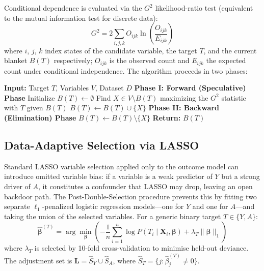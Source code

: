 \documentclass[11pt, a4paper]{article}
\theoremstyle{definition}
\begin{document}
Conditional dependence is evaluated via the $G^2$ likelihood-ratio test (equivalent to the
mutual information test for discrete data):
\begin{equation*}
    G^2 = 2 \sum_{i, j, k} O_{ijk} \ln \left( \frac{O_{ijk}}{E_{ijk}} \right)
\end{equation*}
where $i$, $j$, $k$ index states of the candidate variable, the target $T$, and the
current blanket $B(T)$ respectively; $O_{ijk}$ is the observed count and $E_{ijk}$ the
expected count under conditional independence. The algorithm proceeds in two phases:

\begin{algorithm}[H]
\caption{Fast-IAMB \cite{yaramakala2005speculative}}
\begin{algorithmic}[1]
\State \textbf{Input:} Target $T$, Variables $V$, Dataset $D$
\State \textbf{Phase I: Forward (Speculative) Phase}
\State Initialize $B(T) \gets \emptyset$
\Repeat
    \State Find $X \in V \setminus B(T)$ maximizing the $G^2$ statistic with $T$ given $B(T)$
        \State $B(T) \gets B(T) \cup \{X\}$
    \EndIf
{}
\State \textbf{Phase II: Backward (Elimination) Phase}
        \State $B(T) \gets B(T) \setminus \{X\}$
    \EndIf
\EndFor
\State \textbf{Return:} $B(T)$
\end{algorithmic}
\end{algorithm}

\subsection{Data-Adaptive Selection via LASSO}

Standard LASSO variable selection applied only to the outcome model can introduce omitted
variable bias: if a variable is a weak predictor of $Y$ but a strong driver of $A$, it
constitutes a confounder that LASSO may drop, leaving an open backdoor path. The
Post-Double-Selection procedure \cite{belloni2014inference} prevents this by fitting two
separate $\ell_1$-penalized logistic regression models---one for $Y$ and one for $A$---and
taking the union of the selected variables. For a generic binary target $T \in \{Y, A\}$:
\begin{equation*}
    \hat{\boldsymbol{\beta}}^{(T)} = \arg\min_{\boldsymbol{\beta}}
    \left( -\frac{1}{n} \sum_{i=1}^{n} \log P(T_i \mid \mathbf{X}_i, \boldsymbol{\beta})
    + \lambda_T \|\boldsymbol{\beta}\|_1 \right)
\end{equation*}
where $\lambda_T$ is selected by 10-fold cross-validation to minimise held-out deviance. The adjustment set is
$\mathbf{L} = \hat{S}_Y \cup \hat{S}_A$, where $\hat{S}_T = \{j : \hat{\beta}_j^{(T)} \neq 0\}$.
\end{document}
